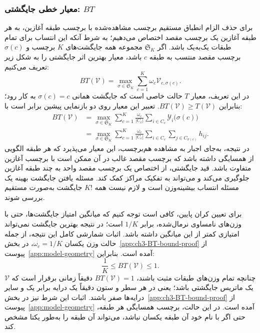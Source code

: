\subsubsection{معیار خطی جایگشتی: \texorpdfstring{$BT$}{BT}}
\label{cmp:subsubsec:ch3-BT}
برای حذف الزام انطباق مستقیم برچسب مشاهده‌شده با برچسب طبقه آغازین، به هر طبقه آغازین یک برچسب مقصد اختصاص می‌دهیم؛ به شرط آنکه این انتساب برای تمام طبقات یک‌به‌یک باشد. اگر $\mathfrak{S}_K$ مجموعه همه جایگشت‌های $K$ برچسب و $\sigma(c)$ برچسب مقصد منتسب به طبقه $c$ باشد، معیار بهترین اثر جایگشتی را به شکل زیر تعریف می‌کنیم:
\begin{equation}\label{cmp:eq:ch3-BT-on-V}
\boxed{BT(\mathcal V)=
\max_{\sigma\in \mathfrak{S}_K}
\sum_{c=1}^{K}\omega_c\mathcal V_{c,\sigma(c)}.}
\end{equation}
در این تعریف، معیار $T$ حالت خاصی است که جایگشت همانی $\sigma(c)=c$ به کار رود؛ بنابراین $BT(\mathcal V)\ge T(\mathcal V)$. تعبیر این معیار روی دو بازنمایی پیشین برابر است با:
\begin{equation}\label{cmp:eq:ch3-BT-on-Y-H}
\begin{aligned}
BT(\mathcal V)
&=\max_{\sigma\in \mathfrak{S}_K}
\sum_{c=1}^{K}\frac{\omega_c}{|C_c|}
\sum_{i\in C_c}\mathscr Y_i\bigl(\sigma(c)\bigr)\\
&=\max_{\sigma\in \mathfrak{S}_K}
\sum_{c=1}^{K}\frac{\omega_c}{|C_c|}
\sum_{i\in C_c}\sum_{j\in C_{\sigma(c)}}h_{ij}.
\end{aligned}
\end{equation}
در نتیجه، به‌جای اجبار به مشاهده هم‌برچسب، این معیار می‌پذیرد که هر طبقه الگویی از همسایگی داشته باشد که برچسب مقصد غالب در آن ممکن است با برچسب آغازین متفاوت باشد. قید جایگشتی، از اختصاص یک برچسب مقصد واحد به چند طبقه آغازین جلوگیری می‌کند و می‌تواند به تفکیک مراکز کمک کند. مسئله یافتن جایگشت بهینه یک مسئله انتساب بیشینه‌وزن است و لازم نیست همه $K!$ جایگشت به‌صورت مستقیم بررسی شوند.

برای تعیین کران پایین، کافی است توجه کنیم که میانگین امتیاز جایگشت‌ها، حتی با وزن‌های نامساوی نرمال‌شده، برابر $1/K$ است؛ در نتیجه بهترین جایگشت نمی‌تواند امتیازی کمتر از این میانگین داشته باشد. اثبات شمارشی کامل این نتیجه، از جمله حالت وزن یکسان $\omega_c=1/K$، در بخش~\ref{app:ch3-BT-bound-proof} از پیوست~\ref{app:model-geometry} آمده است. بنابراین:
\begin{equation}\label{cmp:eq:ch3-BT-bounds}
\boxed{\frac{1}{K}\le BT(\mathcal V)\le1.}
\end{equation}
چنانچه تمام وزن‌های طبقات مثبت باشند، $BT(\mathcal V)=1$ دقیقاً زمانی برقرار است که $\mathcal V$ یک ماتریس جایگشتی باشد؛ یعنی در هر سطر و ستون دقیقاً یک درایه برابر یک و سایر درایه‌ها صفر باشند. اثبات این شرط نیز در بخش~\ref{app:ch3-BT-bound-proof} از پیوست~\ref{app:model-geometry} آمده است. در این حالت، برچسب همسایگی هر طبقه، حتی اگر با نام خود آن طبقه یکسان نباشد، می‌تواند آن طبقه را به‌طور یکتا مشخص کند.


